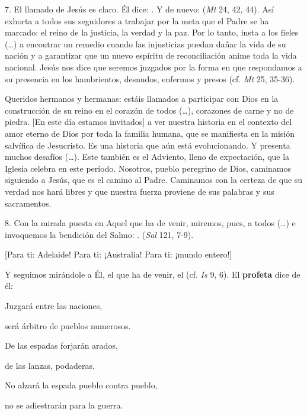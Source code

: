 \begin{body}
	7. El llamado de Jesús es claro. Él dice: . Y de nuevo:  (\emph{Mt} 24, 42, 44). Así exhorta a todos sus seguidores a trabajar por la meta que el Padre se ha marcado: el reino de la justicia, la verdad y la paz. Por lo tanto, insta a los fieles (\ldots{}) a encontrar un remedio cuando las injusticias puedan dañar la vida de su nación y a garantizar que un nuevo espíritu de reconciliación anime toda la vida nacional. Jesús nos dice que seremos juzgados por la forma en que respondamos a su presencia en los hambrientos, desnudos, enfermos y presos (cf. \emph{Mt} 25, 35-36).
	
	Queridos hermanos y hermanas: estáis llamados a participar con Dios en la construcción de su reino en el corazón de todos (\ldots{}), corazones de carne y no de piedra. {[}En este día estamos invitados{]} a ver nuestra historia en el contexto del amor eterno de Dios por toda la familia humana, que se manifiesta en la misión salvífica de Jesucristo. Es una historia que aún está evolucionando. Y presenta muchos desafíos (\ldots{}). Este también es el Adviento, lleno de expectación, que la Iglesia celebra en este período. Nosotros, pueblo peregrino de Dios, caminamos siguiendo a Jesús, que es el camino al Padre. Caminamos con la certeza de que su verdad nos hará libres y que nuestra fuerza proviene de sus palabras y sus sacramentos.
	
	8. Con la mirada puesta en Aquel que ha de venir, miremos, pues, a todos (\ldots{}) e invoquemos la bendición del Salmo: . (\emph{Sal} 121, 7-9).
	
	{[}Para ti: Adelaide! Para ti: ¡Australia! Para ti: ¡mundo entero!{]}
	
	Y seguimos mirándole a Él, el que ha de venir, el  (cf. \emph{Is} 9, 6). El \textbf{profeta} dice de él:
	
	Juzgará entre las naciones,
	
	será árbitro de pueblos numerosos.
	
	De las espadas forjarán arados,
	
	de las lanzas, podaderas.
	
	No alzará la espada pueblo contra pueblo,
	
	no se adiestrarán para la guerra.
	

\end{body}
